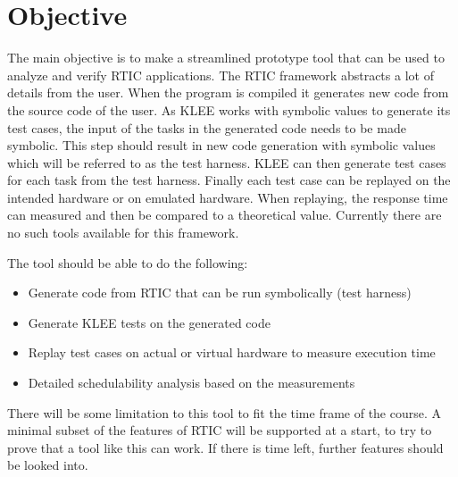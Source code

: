 \section{Objective}
The main objective is to make a streamlined prototype tool that can be used to analyze and verify RTIC applications. The RTIC framework abstracts a lot of details from the user. When the program is compiled it generates new code from the source code of the user. As KLEE works with symbolic values to generate its test cases, the input of the tasks in the generated code needs to be made symbolic. This step should result in new code generation with symbolic values which will be referred to as the test harness. KLEE can then generate test cases for each task from the test harness. Finally each test case can be replayed on the intended hardware or on emulated hardware. When replaying, the response time can measured and then be compared to a theoretical value. Currently there are no such tools available for this framework.

The tool should be able to do the following:
\begin{itemize}
    \item Generate code from RTIC that can be run symbolically (test harness)
    \item Generate KLEE tests on the generated code
    \item Replay test cases on actual or virtual hardware to measure execution time
    \item Detailed schedulability analysis based on the measurements
\end{itemize}
There will be some limitation to this tool to fit the time frame of the course. A minimal subset of the features of RTIC will be supported at a start, to try to prove that a tool like this can work. If there is time left, further features should be looked into.



